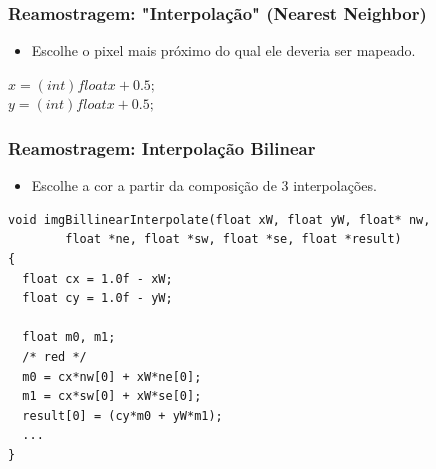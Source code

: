 \documentclass{beamer}
\begin{document}
\begin{frame}
  \frametitle{Reamostragem: "Interpolação" (Nearest Neighbor)}
\begin{itemize}
 \item Escolhe o pixel mais próximo do qual ele deveria ser mapeado.
\end{itemize}
\begin{center}
\end{center}
\pause
  $x = (int) floatx + 0.5;$ \\
  $y = (int) floatx + 0.5;$
\end{frame}

\begin{frame}[fragile]
  \frametitle{Reamostragem: Interpolação Bilinear}
\begin{itemize}
 \item Escolhe a cor a partir da composição de 3 interpolações.\\
\end{itemize}
\begin{center}
\end{center}
\pause
\tiny
\begin{lstlisting}
void imgBillinearInterpolate(float xW, float yW, float* nw,
        float *ne, float *sw, float *se, float *result)
{
  float cx = 1.0f - xW;
  float cy = 1.0f - yW;

  float m0, m1;
  /* red */
  m0 = cx*nw[0] + xW*ne[0];
  m1 = cx*sw[0] + xW*se[0];
  result[0] = (cy*m0 + yW*m1);
  ...
}
\end{lstlisting}
\end{frame}
\end{document}
